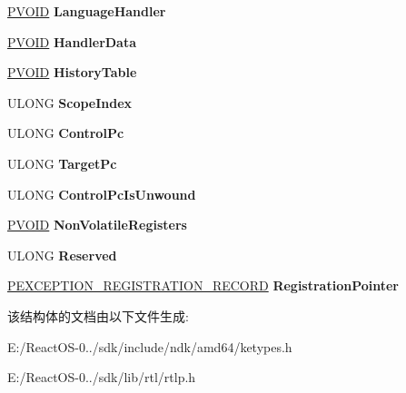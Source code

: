 \begin{DoxyCompactItemize}
\hyperlink{interfacevoid}{P\+V\+O\+ID} {\bfseries Language\+Handler}
\item 
\mbox{\label{struct___d_i_s_p_a_t_c_h_e_r___c_o_n_t_e_x_t_a9c25ab90628afe6d0047841b6d88ac0a}} 
\hyperlink{interfacevoid}{P\+V\+O\+ID} {\bfseries Handler\+Data}
\item 
\mbox{\label{struct___d_i_s_p_a_t_c_h_e_r___c_o_n_t_e_x_t_aabbfeeb680bf6fa503fdc1ff5e4b7cc4}} 
\hyperlink{interfacevoid}{P\+V\+O\+ID} {\bfseries History\+Table}
\item 
\mbox{\label{struct___d_i_s_p_a_t_c_h_e_r___c_o_n_t_e_x_t_ad2f15c2405c1d4ef3537f804a464dc0b}} 
U\+L\+O\+NG {\bfseries Scope\+Index}
\item 
\mbox{\label{struct___d_i_s_p_a_t_c_h_e_r___c_o_n_t_e_x_t_a988c0d95799a484fca66d139760ce8c7}} 
U\+L\+O\+NG {\bfseries Control\+Pc}
\item 
\mbox{\label{struct___d_i_s_p_a_t_c_h_e_r___c_o_n_t_e_x_t_a3544f69aadb9caab2cd14f6d0b1349dd}} 
U\+L\+O\+NG {\bfseries Target\+Pc}
\item 
\mbox{\label{struct___d_i_s_p_a_t_c_h_e_r___c_o_n_t_e_x_t_ae9e564b395d8f209fabdb83b5a34abed}} 
U\+L\+O\+NG {\bfseries Control\+Pc\+Is\+Unwound}
\item 
\mbox{\label{struct___d_i_s_p_a_t_c_h_e_r___c_o_n_t_e_x_t_a262e28605e774c5f5825bf8eccb69951}} 
\hyperlink{interfacevoid}{P\+V\+O\+ID} {\bfseries Non\+Volatile\+Registers}
\item 
\mbox{\label{struct___d_i_s_p_a_t_c_h_e_r___c_o_n_t_e_x_t_ae37f76b10a0b461b415f50dbc9a6a28d}} 
U\+L\+O\+NG {\bfseries Reserved}
\item 
\mbox{\label{struct___d_i_s_p_a_t_c_h_e_r___c_o_n_t_e_x_t_a6173ce0f46388d072c73e52767f7144a}} 
\hyperlink{struct___e_x_c_e_p_t_i_o_n___r_e_g_i_s_t_r_a_t_i_o_n___r_e_c_o_r_d}{P\+E\+X\+C\+E\+P\+T\+I\+O\+N\+\_\+\+R\+E\+G\+I\+S\+T\+R\+A\+T\+I\+O\+N\+\_\+\+R\+E\+C\+O\+RD} {\bfseries Registration\+Pointer}
\end{DoxyCompactItemize}


该结构体的文档由以下文件生成\+:\begin{DoxyCompactItemize}
\item 
E\+:/\+React\+O\+S-\/0../sdk/include/ndk/amd64/ketypes.\+h\item 
E\+:/\+React\+O\+S-\/0../sdk/lib/rtl/rtlp.\+h\end{DoxyCompactItemize}

